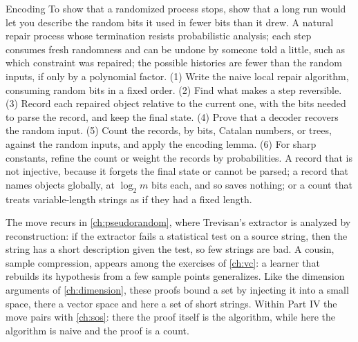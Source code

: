 \begin{refsection}
\begin{move}{Encoding}
 To show that a randomized process stops, show that a long run would let you describe the random bits it used in fewer bits than it drew.
 A natural repair process whose termination resists probabilistic analysis; each step consumes fresh randomness and can be undone by someone told a little, such as which constraint was repaired; the possible histories are fewer than the random inputs, if only by a polynomial factor.
 (1) Write the naive local repair algorithm, consuming random bits in a fixed order. (2) Find what makes a step reversible. (3) Record each repaired object relative to the current one, with the bits needed to parse the record, and keep the final state. (4) Prove that a decoder recovers the random input. (5) Count the records, by bits, Catalan numbers, or trees, against the random inputs, and apply the encoding lemma. (6) For sharp constants, refine the count or weight the records by probabilities.
 A record that is not injective, because it forgets the final state or cannot be parsed; a record that names objects globally, at $\log_2m$ bits each, and so saves nothing; or a count that treats variable-length strings as if they had a fixed length.
\end{move}


The move recurs in \cref{ch:pseudorandom}, where Trevisan's extractor is analyzed by reconstruction: if the extractor fails a statistical test on a source string, then the string has a short description given the test, so few strings are bad. A cousin, sample compression, appears among the exercises of \cref{ch:vc}: a learner that rebuilds its hypothesis from a few sample points generalizes. Like the dimension arguments of \cref{ch:dimension}, these proofs bound a set by injecting it into a small space, there a vector space and here a set of short strings. Within Part IV the move pairs with \cref{ch:sos}: there the proof itself is the algorithm, while here the algorithm is naive and the proof is a count.


\end{refsection}
